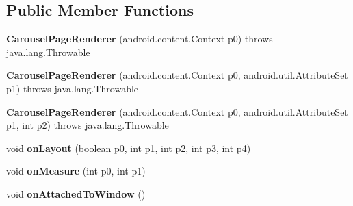 \subsection*{Public Member Functions}
\begin{DoxyCompactItemize}
\item 
\hypertarget{classmd5282f1122c1313907b9bf274dd2c2f344_1_1CarouselPageRenderer_a6b98c47eb6f65f06e5d81183d883aa82}{}{\bfseries Carousel\+Page\+Renderer} (android.\+content.\+Context p0)  throws java.\+lang.\+Throwable 	\label{classmd5282f1122c1313907b9bf274dd2c2f344_1_1CarouselPageRenderer_a6b98c47eb6f65f06e5d81183d883aa82}

\item 
\hypertarget{classmd5282f1122c1313907b9bf274dd2c2f344_1_1CarouselPageRenderer_a6ef1d375fb35e6c9c6429cc86840bb27}{}{\bfseries Carousel\+Page\+Renderer} (android.\+content.\+Context p0, android.\+util.\+Attribute\+Set p1)  throws java.\+lang.\+Throwable 	\label{classmd5282f1122c1313907b9bf274dd2c2f344_1_1CarouselPageRenderer_a6ef1d375fb35e6c9c6429cc86840bb27}

\item 
\hypertarget{classmd5282f1122c1313907b9bf274dd2c2f344_1_1CarouselPageRenderer_aeab7144e5122e02229151eede4a94279}{}{\bfseries Carousel\+Page\+Renderer} (android.\+content.\+Context p0, android.\+util.\+Attribute\+Set p1, int p2)  throws java.\+lang.\+Throwable 	\label{classmd5282f1122c1313907b9bf274dd2c2f344_1_1CarouselPageRenderer_aeab7144e5122e02229151eede4a94279}

\item 
\hypertarget{classmd5282f1122c1313907b9bf274dd2c2f344_1_1CarouselPageRenderer_a156c9a3073bf5e46dff95b049d0babd4}{}void {\bfseries on\+Layout} (boolean p0, int p1, int p2, int p3, int p4)\label{classmd5282f1122c1313907b9bf274dd2c2f344_1_1CarouselPageRenderer_a156c9a3073bf5e46dff95b049d0babd4}

\item 
\hypertarget{classmd5282f1122c1313907b9bf274dd2c2f344_1_1CarouselPageRenderer_a5c4ef72a981e45ba4c5bcc9b082c38af}{}void {\bfseries on\+Measure} (int p0, int p1)\label{classmd5282f1122c1313907b9bf274dd2c2f344_1_1CarouselPageRenderer_a5c4ef72a981e45ba4c5bcc9b082c38af}

\item 
\hypertarget{classmd5282f1122c1313907b9bf274dd2c2f344_1_1CarouselPageRenderer_af1184b560fb11e5b479a4d6f309596ec}{}void {\bfseries on\+Attached\+To\+Window} ()\label{classmd5282f1122c1313907b9bf274dd2c2f344_1_1CarouselPageRenderer_af1184b560fb11e5b479a4d6f309596ec}


\end{DoxyCompactItemize}
